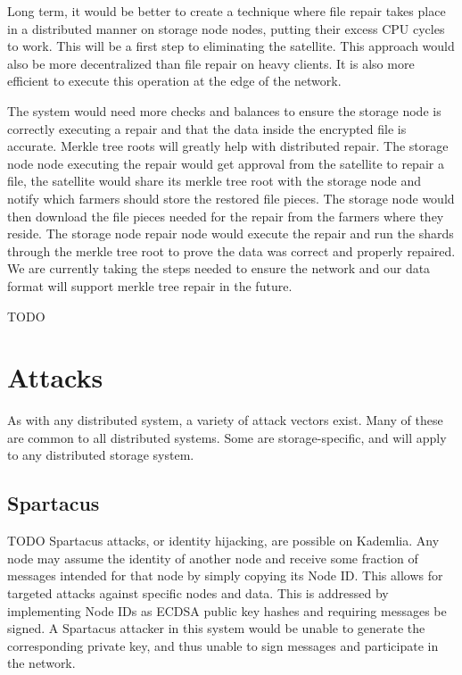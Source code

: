 \documentclass[a4paper,10pt]{article} \usepackage[utf8]{inputenc}
\newcommand{\todo}[1]{{\color{red} TODO #1 }}
\begin{document}
Long term, it would be better to create a technique where file repair takes
place in a distributed manner on storage node nodes, putting their excess CPU 
cycles
to work. This will be a first step to eliminating the satellite. This
approach would also be more decentralized than file repair on heavy clients. It
is also more efficient to execute this operation at the edge of the network.

The system would need more checks and balances to ensure the storage node is 
correctly
executing a repair and that the data inside the encrypted file is accurate.
Merkle tree roots will greatly help with distributed repair. The storage node 
node
executing the repair would get approval from the satellite to repair a file,
the satellite would share its merkle tree root with the storage node and 
notify
which farmers should store the restored file pieces. The storage node would then
download the file pieces needed for the repair from the farmers where they
reside. The storage node repair node would execute the repair and run the shards
through the merkle tree root to prove the data was correct and properly
repaired. We are currently taking the steps needed to ensure the network and our
data format will support merkle tree repair in the future.

\todo{}

\newpage \appendix

\section{Attacks}

As with any distributed system, a variety of attack vectors exist. Many of these
are common to all distributed systems. Some are storage-specific, and will apply
to any distributed storage system.

\subsection{Spartacus}

\todo{ Spartacus attacks, or identity hijacking, are possible on Kademlia. Any
node may assume the identity of another node and receive some fraction of
messages intended for that node by simply copying its Node ID. This allows for
targeted attacks against specific nodes and data. This is addressed by
implementing Node IDs as ECDSA public key hashes and requiring messages be
signed. A Spartacus attacker in this system would be unable to generate the
corresponding private key, and thus unable to sign messages and participate in
the network. }
\end{document}
